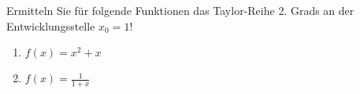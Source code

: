 \item Ermitteln Sie für folgende Funktionen das Taylor-Reihe 2. Grads an der Entwicklungsstelle $x_0=1$!

\begin{multicols}{2}
\begin{enumerate}
\item $f(x) = x^2+x$
\item $f(x) = \frac{1}{1+x}$ 
\end{enumerate}
\end{multicols}

